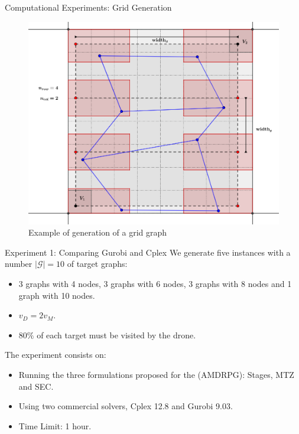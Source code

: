 \documentclass[slidestop,usepdftitle=false,10pt]{beamer}
\begin{document}
	\begin{frame}{Computational Experiments: Grid Generation}
        \begin{figure}[h!]
        \begin{center}
         \includegraphics[width=0.6\linewidth]{Grid_generation_2.png}
        \end{center}
        \caption{Example of generation of a grid graph}
        \label{fig:fig1}
        \end{figure}
 
	\end{frame}
	
	\begin{frame}{Experiment 1: Comparing Gurobi and Cplex}
	    We generate five instances with a number $|\mathcal G|= 10$ of target graphs:
	    \begin{itemize}
	        \item 3 graphs with 4 nodes, 3 graphs with 6 nodes, 3 graphs with 8 nodes and 1 graph with 10 nodes.
	        \item $v_D= 2v_M$.
	        \item $80\%$ of each target must be visited by the drone.
	    \end{itemize}
	    
	    The experiment consists on:
	    \begin{itemize}
	        \item Running the three formulations proposed for the (AMDRPG): Stages, MTZ and SEC.
	        \item Using two commercial solvers, Cplex 12.8 and Gurobi 9.03.
	        \item Time Limit: 1 hour.
	    \end{itemize}
	\end{frame}
	
\end{document}
